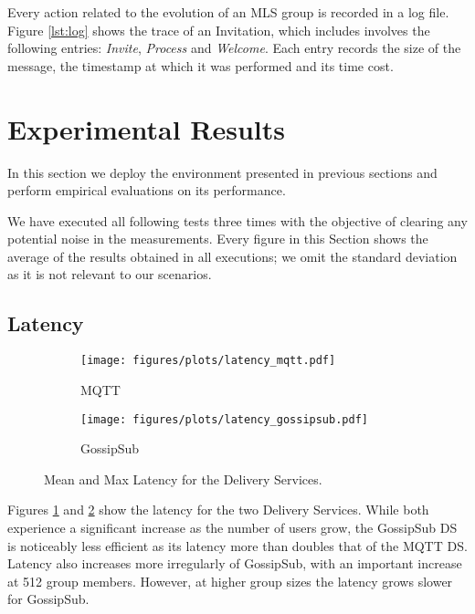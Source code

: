 \documentclass[preprint, 12pt]{elsarticle}
\begin{document}
Every action related to the evolution of an MLS group is recorded in a log file. Figure \ref{lst:log} shows the trace of an Invitation, which includes involves the following entries: \textit{Invite}, \textit{Process} and \textit{Welcome}. Each entry records the size of the message, the timestamp at which it was performed and its time cost.

\section{Experimental Results} 
\label{sec:result}

In this section we deploy the environment presented in previous sections and perform empirical evaluations on its performance. 

We have executed all following tests three times with the objective of clearing any potential noise in the measurements. Every figure in this Section shows the average of the results obtained in all executions; we omit the standard deviation as it is not relevant to our scenarios.

\subsection{Latency}
\label{sec:lat}

\begin{figure*}
    \centering
    \begin{subfigure}[b]{0.45\textwidth}
        \centering
        \texttt{[image: figures/plots/latency\_mqtt.pdf]}
        \caption{MQTT}
        \label{fig:lat_mqtt}
    \end{subfigure}
    \begin{subfigure}[b]{0.45\textwidth}
        \centering
        \texttt{[image: figures/plots/latency\_gossipsub.pdf]}
        \caption{GossipSub}
        \label{fig:lat_gossipsub}
    \end{subfigure}
    \caption{Mean and Max Latency for the Delivery Services.}
    \label{fig:cpu_time}
\end{figure*}

Figures \ref{fig:lat_mqtt} and \ref{fig:lat_gossipsub} show the latency for the two Delivery Services. While both experience a significant increase as the number of users grow, the GossipSub DS is noticeably less efficient as its latency more than doubles that of the MQTT DS. Latency also increases more irregularly of GossipSub, with an important increase at 512 group members. However, at higher group sizes the latency grows slower for GossipSub. 
\end{document}
